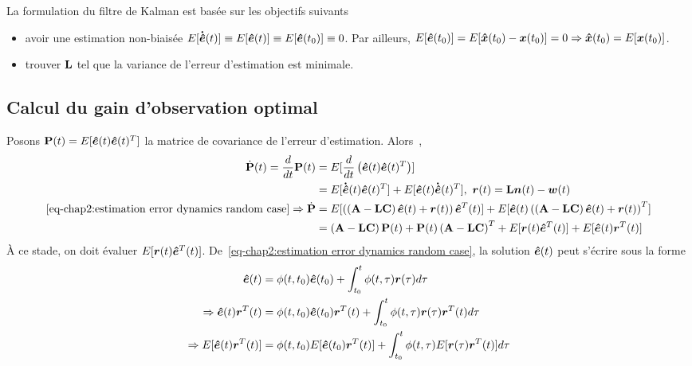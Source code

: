 La formulation du filtre de Kalman est basée sur les objectifs suivants 
 \begin{itemize}
 	\item avoir une estimation non-biaisée $E[\bm{\dot{\hat{e}}}(t)]\equiv E[\bm{\hat{e}}(t)] \equiv E[\bm{\hat{e}}(t_0)]\equiv0$. Par ailleurs,  $E[\bm{\hat{e}}(t_0)]=E[\bm{\hat{x}}(t_0) - \bm{x}(t_0)]=0 \Rightarrow\bm{\hat{x}}(t_0)=E[\bm{x}(t_0)]$.
 	\item trouver $\mathbf{L}$ tel que la variance de l'erreur d'estimation est minimale.
 \end{itemize}
\subsection{Calcul du gain d'observation optimal}
Posons $\mathbf{P}(t)=E[\bm{\hat{e}}(t)\bm{\hat{e}}(t)^T]$ la matrice de covariance de l'erreur d'estimation. Alors~\cite{athans1967tac},
\begin{align}\label{eq-chap2:covariance matrix derivative}
	\begin{split}
		\dot{\mathbf{P}}(t)=\frac{d}{dt}\mathbf{P}(t)&=E[\frac{d}{dt}\left(\bm{\hat{e}}(t)\bm{\hat{e}}(t)^T\right)] \\	
		&=E[\bm{\dot{\hat{e}}}(t)\bm{\hat{e}}(t)^T] + E[\bm{\hat{e}}(t)\bm{\dot{\hat{e}}}(t)^T], \ \bm{r}(t) =\mathbf{L}\bm{n}(t)-\bm{w} 	(t) \\
		\eqref{eq-chap2:estimation error dynamics random case} \Rightarrow 	\dot{\mathbf{P}} &= E[\left(\left(\mathbf{A}-\mathbf{L}\mathbf{C}\right)\bm{\hat{e}}(t) + \bm{r}(t)\right)\bm{\hat{e}}^T(t)]+E[\bm{\hat{e}}(t)\left(\left(\mathbf{A}-\mathbf{L}\mathbf{C}\right)\bm{\hat{e}}(t) + \bm{r}(t)\right)^T]\\
		&=\left(\mathbf{A}-\mathbf{L}\mathbf{C}\right)\mathbf{P}(t) + \mathbf{P}(t)\left(\mathbf{A}-\mathbf{L}\mathbf{C}\right)^T+ E[\bm{r}(t)\bm{\hat{e}}^T(t)] + E[\bm{\hat{e}}(t)\bm{r}^T(t)]
	\end{split}	
\end{align}
À ce stade, on doit évaluer $E[\bm{r}(t)\bm{\hat{e}}^T(t)]$.
De~\eqref{eq-chap2:estimation error dynamics random case}, la solution $\bm{\hat{e}}(t)$ peut s'écrire sous la forme 
\begin{align}
	\begin{split}
		\bm{\hat{e}}(t) &= \phi(t,t_0)\bm{\hat{e}}(t_0)+\int_{t_0}^{t}\phi(t,\tau)\bm{r}(\tau)d\tau \\
		\Rightarrow \bm{\hat{e}}(t)\bm{r}^T(t) &= \phi(t,t_0)\bm{\hat{e}}(t_0)\bm{r}^T(t)+\int_{t_0}^{t}\phi(t,\tau)\bm{r}(\tau)\bm{r}^T(t)d\tau\\
		\Rightarrow E[\bm{\hat{e}}(t)\bm{r}^T(t)] &=\phi(t,t_0)E[\bm{\hat{e}}(t_0)\bm{r}^T(t)] + \int_{t_0}^{t}\phi(t,\tau)E[\bm{r}(\tau)\bm{r}^T(t)]d\tau
	\end{split}
\end{align}
